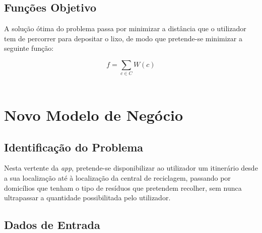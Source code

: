 \documentclass[article, a4paper, 12pt, oneside]{memoir}
\begin{document}
\subsection{Funções Objetivo}

A solução ótima do problema passa por minimizar a distância que o utilizador tem de percorrer para depositar o lixo, de modo que pretende-se minimizar a seguinte função:

$$f = \sum_{c \in C} W(c)$$\\


\section{Novo Modelo de Negócio}

\subsection{Identificação do Problema}

Nesta vertente da \textit{app}, pretende-se disponibilizar ao utilizador um itinerário desde a sua localização até à localização da central de reciclagem, passando por domicílios que tenham o tipo de resíduos que pretendem recolher, sem nunca ultrapassar a quantidade possibilitada pelo utilizador.

\subsection{Dados de Entrada}
\end{document}
